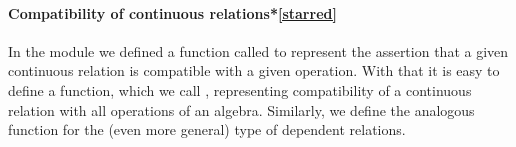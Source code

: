 \paragraph*{Compatibility of continuous relations*\protect\cref{starred}}

In the  module we defined a function called  to represent the assertion that a given continuous relation is compatible with a given operation. With that it is easy to define a function, which we call , representing compatibility of a continuous relation with all operations of an algebra. Similarly, we define the analogous  function for the (even more general)
type of dependent relations.
\ccpad
\begin{code}%
\>[1]\AgdaSpace{}%
\AgdaSymbol{:}\AgdaSpace{}%
\AgdaSymbol{\{}\AgdaSpace{}%
\AgdaSymbol{:}\AgdaSpace{}%
\AgdaSpace{}%
\AgdaSymbol{\}(}\AgdaSpace{}%
\AgdaSymbol{:}\AgdaSpace{}%
\AgdaSpace{}%
\AgdaSpace{}%
\AgdaSymbol{)}\AgdaSpace{}%
\AgdaSpace{}%
\AgdaSpace{}%
\AgdaSpace{}%
\AgdaSpace{}%
\AgdaSpace{}%
\AgdaSpace{}%
\AgdaSpace{}%
\AgdaSpace{}%
\AgdaSpace{}%
\AgdaSpace{}%
\AgdaSpace{}%

\end{code}
